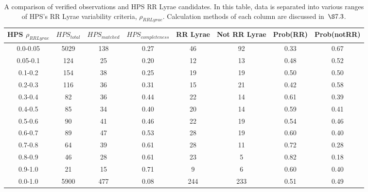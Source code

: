 \documentclass[aps,prb,twocolumn,superscriptaddress]{revtex4-1}
\begin{document}
\begin{table}
	\begin{center}
		\begin{tabular}{|c|c|c|c|c|c|c|c|}\hline
HPS $\rho_{RRLyrae}$ & $HPS_{total}$ & $HPS_{matched}$ & $HPS_{completeness}$ & RR Lyrae & Not RR Lyrae & Prob(RR) & Prob(notRR) \\ \hline
0.0-0.05 & 5029 & 138 	& 0.27 & 46 		& 92 & 0.33 & 0.67 \\ \hline
0.05-0.1 & 124 	& 25 	& 0.20 & 12 		& 13 & 0.48 & 0.52 \\ \hline
0.1-0.2 & 154 	& 38 	& 0.25 & 19 		& 19 & 0.50 & 0.50 \\ \hline
0.2-0.3 & 116 	& 36 	& 0.31 & 15 		& 21 & 0.42 & 0.58 \\ \hline
0.3-0.4 & 82 	& 36 	& 0.44 & 22 		& 14 & 0.61 & 0.39 \\ \hline
0.4-0.5 & 85 	& 34 	& 0.40 & 20		& 14 & 0.59 & 0.41 \\ \hline
0.5-0.6 & 90 	& 41 	& 0.46 & 22		& 19 & 0.54 & 0.46 \\ \hline
0.6-0.7 & 89 	& 47 	& 0.53 & 28		& 19 & 0.60 & 0.40 \\ \hline
0.7-0.8 & 64 	& 39 	& 0.61 & 28 		& 11 & 0.72 & 0.28 \\ \hline
0.8-0.9 & 46 	& 28 	& 0.61& 23 		& 5 & 0.82 & 0.18 \\ \hline
0.9-1.0 & 21 	& 15 	& 0.71 & 9			& 6 & 0.60 & 0.40 \\ \hline
\hline
0.0-1.0 & 5900 & 477 & 0.08 & 244 & 233 & 0.51 & 0.49  \\ \hline
		\end{tabular}
	\end{center}
\caption{ \small{A comparison of verified observations and HPS RR Lyrae candidates. In this table, data is separated into various ranges of HPS's RR Lyrae variability criteria, $\rho_{RRLyrae}$.  Calculation methods of each column are discussed in~$\S 7.3$.\label{tab:HPSlim15}}}
\end{table} 
\end{document}
